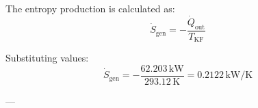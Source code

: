The entropy production is calculated as:  
\[
\dot{S}_{\text{gen}} = -\frac{\dot{Q}_{\text{out}}}{T_{\text{KF}}}
\]  

Substituting values:  
\[
\dot{S}_{\text{gen}} = -\frac{62.203 \, \text{kW}}{293.12 \, \text{K}} = 0.2122 \, \text{kW/K}
\]  

---
